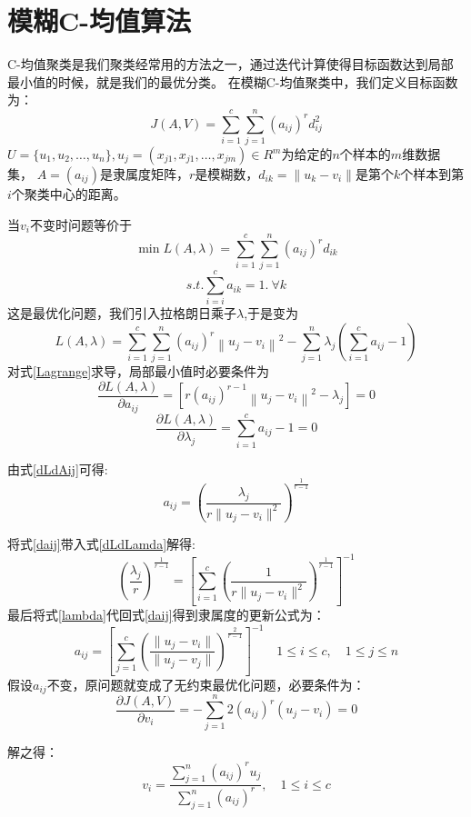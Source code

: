 \section{模糊C-均值算法}
C-均值聚类是我们聚类经常用的方法之一，通过迭代计算使得目标函数达到局部最小值的时候，就是我们的最优分类。
在模糊C-均值聚类中，我们定义目标函数为：
\begin{equation}
    J(A, V)=\sum_{i=1}^{c} \sum_{j=1}^{n}\left(a_{i j}\right)^{r} d_{i j}^2
\end{equation}
$U=\{u_1,u_2,\dots,u_n\},u_j=(x_{j1},x_{j1},\dots,x_{jm})\in R^m$为给定的$n$个样本的$m$维数据集，
$A=(a_{i j})$是隶属度矩阵，$r$是模糊数，$d_{i k}=\| u_k-v_i\|$是第个$k$个样本到第$i$个聚类中心的距离。
\par
当$v_i$不变时问题等价于
\begin{equation}
    \min L(A, \lambda)=\sum_{i=1}^{c} \sum_{j=1}^{n}\left(a_{i j}\right)^{r}d_{i k}
\end{equation}
\begin{equation}
    s.t.  \sum_{i=i}^c a_{i k}=1.\  \forall k
\end{equation}
这是最优化问题，我们引入拉格朗日乘子$\lambda$,于是变为
\begin{equation}
    L(A, \lambda)=\sum_{i=1}^{c} \sum_{j=1}^{n}\left(a_{i j}\right)^{r}\left\|u_{j}-v_{i}\right\|^{2}-\sum_{j=1}^{n} \lambda_{j}\left(\sum_{i=1}^{c} a_{i j}-1\right)
    \label{Lagrange}
\end{equation}
对式\ref{Lagrange}求导，局部最小值时必要条件为
\begin{equation}
    \frac{\partial L(A, \lambda)}{\partial a_{i j}}=\left[r\left(a_{i j}\right)^{r-1}\left\|u_{j}-v_{i}\right\|^{2}-\lambda_{j}\right]=0
    \label{dLdAij}
\end{equation}
\begin{equation}
    \frac{\partial L(A, \lambda)}{\partial \lambda_{j}}=\sum_{i=1}^{c} a_{i j}-1=0
    \label{dLdLamda}
\end{equation}

由式\ref{dLdAij}可得:
\begin{equation}
    a_{i j}=\left( \frac{\lambda_j}{r \|u_{j}-v_{i}\|^2} \right)^{\frac{1}{r-1}}
    \label{daij}
\end{equation}

将式\ref{daij}带入式\ref{dLdLamda}解得:
\begin{equation}
    \left(\frac{\lambda_j}{r}\right)^{\frac{1}{r-1}}=\left[\sum\limits_{i=1}^c( \frac{1}{r \|u_{j}-v_{i}\|^2})^{\frac{1}{r-1}} \right]^{-1}
    \label{lambda}
\end{equation}
\newpage
最后将式\ref{lambda}代回式\ref{daij}得到隶属度的更新公式为：
\begin{equation}
    a_{i j}=\left[\sum\limits_{j=1}^c\left( \frac{\|u_{j}-v_{i}\|}{\|u_{j}-v_{j}\|} \right)^{\frac{2}{r-1}}\right]^{-1}
    \quad 1 \leqslant i \leqslant c,\quad 1 \leqslant j \leqslant n
    \label{aij}
\end{equation}
假设$a_{i j}$不变，原问题就变成了无约束最优化问题，必要条件为：
\begin{equation}
        \frac{\partial J(A, V)}{\partial v_{i}}=-\sum_{j=1}^{n} 2\left(a_{i j}\right)^{r}\left(u_{j}-v_{i}\right)=0 
\end{equation}

解之得：
\begin{equation}
    v_{i}=\frac{\sum\limits_{j=1}^{n}\left(a_{i j}\right)^{r} u_{j}}{\sum\limits_{j=1}^{n}\left(a_{i j}\right)^{r}}, \quad 1 \leqslant i \leqslant c
    \label{vij}
\end{equation}
